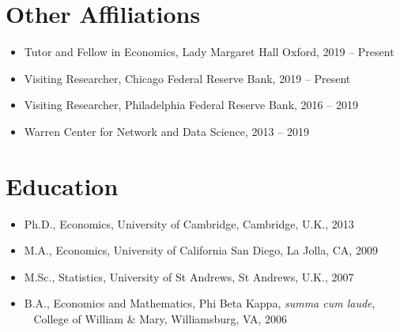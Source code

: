 \documentclass[line,overlapped]{myres}
\begin{document}
\begin{resume}
\section{\sc Other Affiliations}
\begin{itemize}
\item Tutor and Fellow in Economics, Lady Margaret Hall Oxford, 2019 -- Present
\item Visiting Researcher, Chicago Federal Reserve Bank, 2019 -- Present
\item Visiting Researcher, Philadelphia Federal Reserve Bank, 2016 -- 2019
\item Warren Center for Network and Data Science, 2013 -- 2019 
\end{itemize}

\section{\sc Education}
\begin{itemize}
\item Ph.D., Economics, University of Cambridge, Cambridge, U.K., 2013
\item M.A., Economics, University of California San Diego, La Jolla, CA, 2009
\item M.Sc., Statistics, University of St Andrews, St Andrews, U.K., 2007
\item B.A., Economics and Mathematics, Phi Beta Kappa, \emph{summa cum laude},\\ 
  \-\ \hspace{1em} College of William \& Mary, Williamsburg, VA, 2006
\end{itemize}





\end{resume}
\end{document}
